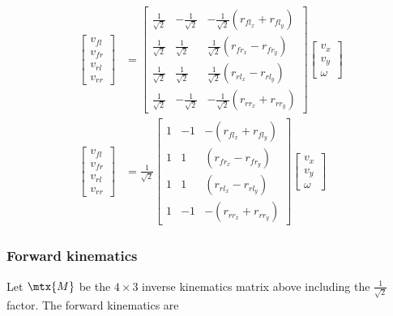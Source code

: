 \begin{align}
  \begin{bmatrix}
    v_{fl} \\
    v_{fr} \\
    v_{rl} \\
    v_{rr}
  \end{bmatrix} &=
  \begin{bmatrix}
    \frac{1}{\sqrt{2}} & -\frac{1}{\sqrt{2}} &
      -\frac{1}{\sqrt{2}}(r_{fl_x} + r_{fl_y}) \\
    \frac{1}{\sqrt{2}} &  \frac{1}{\sqrt{2}} &
      \frac{1}{\sqrt{2}}(r_{fr_x} - r_{fr_y}) \\
    \frac{1}{\sqrt{2}} &  \frac{1}{\sqrt{2}} &
      \frac{1}{\sqrt{2}}(r_{rl_x} - r_{rl_y}) \\
    \frac{1}{\sqrt{2}} & -\frac{1}{\sqrt{2}} &
      -\frac{1}{\sqrt{2}}(r_{rr_x} + r_{rr_y})
  \end{bmatrix}
  \begin{bmatrix}
    v_x \\
    v_y \\
    \omega
  \end{bmatrix} \nonumber \\
  \begin{bmatrix}
    v_{fl} \\
    v_{fr} \\
    v_{rl} \\
    v_{rr}
  \end{bmatrix} &= \frac{1}{\sqrt{2}}
  \begin{bmatrix}
    1 & -1  & -(r_{fl_x} + r_{fl_y}) \\
    1 &  1  &  (r_{fr_x} - r_{fr_y}) \\
    1 &  1  &  (r_{rl_x} - r_{rl_y}) \\
    1 & -1  & -(r_{rr_x} + r_{rr_y})
  \end{bmatrix}
  \begin{bmatrix}
    v_x \\
    v_y \\
    \omega
  \end{bmatrix}
\end{align}

\subsubsection{Forward kinematics}

Let $\mtx{M}$ be the $4 \times 3$ inverse kinematics matrix above including the
$\frac{1}{\sqrt{2}}$ factor. The forward kinematics are

